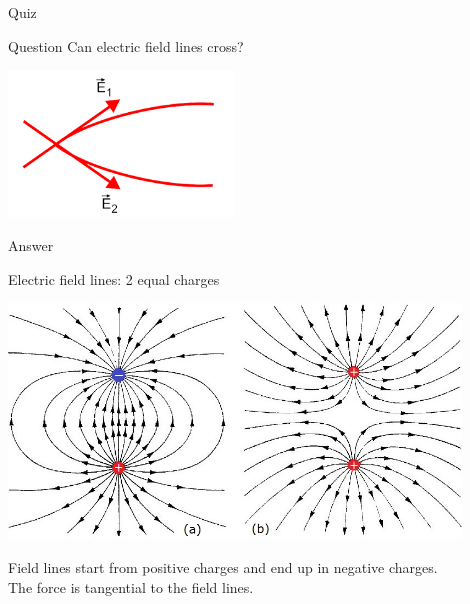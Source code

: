 %
%

{
\problemslide

\begin{frame}{Quiz}

\begin{blockexmplque}{Question}
  Can electric field lines cross?\\
   \vspace{0.3cm}
   \begin{center}
     \includegraphics[width=0.45\textwidth]{./images/problems/lect1_impossible_crossing_field_lines.png}\\
   \end{center}
\end{blockexmplque}

\begin{blockexmplans}{Answer}
\noindent
\end{blockexmplans}

\end{frame}

} %

%
%

\begin{frame}{Electric field lines: 2 equal charges}

\begin{center}
 \includegraphics[width=0.90\textwidth]{./images/schematics/electric_field_lines_2_equal_charges_pp_and_np.jpg}
\end{center}

{\small
Field lines start from positive charges and end up in negative charges.\\
The force is tangential to the field lines.
}

\end{frame}


